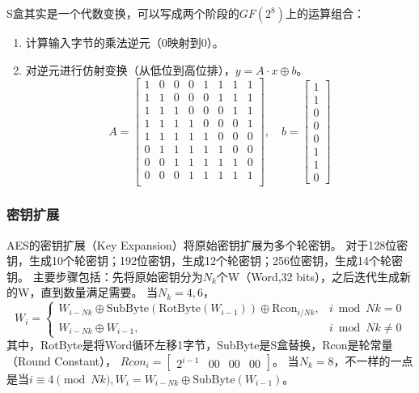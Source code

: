 S盒其实是一个代数变换，可以写成两个阶段的$GF(2^8)$上的运算组合：
\begin{enumerate}
    \item 计算输入字节的乘法逆元（0映射到0）。
    \item 对逆元进行仿射变换（从低位到高位排），$y = A \cdot x \oplus b$。
$$
A =
\begin{bmatrix}
1 & 0 & 0 & 0 & 1 & 1 & 1 & 1 \\
1 & 1 & 0 & 0 & 0 & 1 & 1 & 1 \\
1 & 1 & 1 & 0 & 0 & 0 & 1 & 1 \\
1 & 1 & 1 & 1 & 0 & 0 & 0 & 1 \\
1 & 1 & 1 & 1 & 1 & 0 & 0 & 0 \\
0 & 1 & 1 & 1 & 1 & 1 & 0 & 0 \\
0 & 0 & 1 & 1 & 1 & 1 & 1 & 0 \\
0 & 0 & 0 & 1 & 1 & 1 & 1 & 1 \\
\end{bmatrix},
\quad
b =
\begin{bmatrix}
1 \\ 1 \\ 0 \\ 0 \\ 0 \\ 1 \\ 1 \\ 0
\end{bmatrix}
$$
\end{enumerate}

\subsubsection{密钥扩展}
AES的密钥扩展（Key Expansion）将原始密钥扩展为多个轮密钥。
对于128位密钥，生成10个轮密钥；192位密钥，生成12个轮密钥；256位密钥，生成14个轮密钥。
主要步骤包括：先将原始密钥分为$N_k$个W（Word,32 bits），之后迭代生成新的W，直到数量满足需要。
当$N_k=4,6$，
$$
W_i =
\begin{cases}
W_{i - Nk} \oplus \text{SubByte}(\text{RotByte}(W_{i-1})) \oplus \text{Rcon}_{i/Nk}, & i \bmod Nk = 0 \\
W_{i - Nk} \oplus W_{i-1}, & i \bmod Nk \neq 0
\end{cases}
$$
其中，RotByte是将Word循环左移1字节，SubByte是S盒替换，Rcon是轮常量（Round Constant），
$Rcon_i = \begin{bmatrix}2^{i-1} & 00 & 00 & 00\end{bmatrix}$。
当$N_k=8$，不一样的一点是当$i \equiv 4 \pmod{Nk},W_i=W_{i - Nk} \oplus \text{SubByte}(W_{i-1})$。
